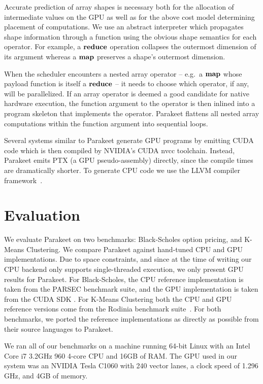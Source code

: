 \documentclass[10pt,twocolumn]{article}
\begin{document}
Accurate prediction of array shapes is necessary both for the allocation of intermediate values on the GPU as well as for the above cost model determining placement of computations. We use an abstract interpreter which propagates shape information through a function using the obvious shape semantics for each operator. For example, a $\mbox{\textbf{reduce}}$ operation collapses the outermost dimension of its argument whereas a $\mbox{\textbf{map}}$ preserves a shape's outermost dimension.

When the scheduler encounters a nested array operator -- e.g.~a $\mbox{\textbf{map}}$ whose payload function is itself a $\mbox{\textbf{reduce}}$ -- it needs to choose which operator, if any, will be parallelized.  If an array operator is deemed a good candidate for native hardware execution, the function argument to the operator is then inlined into a program skeleton that implements the operator. Parakeet flattens all nested array computations within the function argument into sequential loops.

Several systems similar to Parakeet \cite{Cata11,Chaf11} generate GPU programs by emitting CUDA code which is then compiled by NVIDIA's CUDA nvcc toolchain. Instead, Parakeet emits PTX (a GPU pseudo-assembly) directly, since the compile times are dramatically shorter. To generate CPU code we use the LLVM compiler framework~\cite{Latt02}.

\section{Evaluation}
\label{Evaluation}

We evaluate Parakeet on two benchmarks: Black-Scholes option pricing, and K-Means Clustering.  We compare Parakeet against hand-tuned CPU and GPU implementations.  Due to space constraints, and since at the time of writing our CPU backend only supports single-threaded execution, we only present GPU results for Parakeet.  For Black-Scholes, the CPU reference implementation is taken from the PARSEC \cite{Bien08} benchmark suite, and the GPU implementation is taken from the CUDA SDK \cite{NvidSD}.  For K-Means Clustering both the CPU and GPU reference versions come from the Rodinia benchmark suite~\cite{Che09}.  For both benchmarks, we ported the reference implementations as directly as possible from their source languages to Parakeet.

We ran all of our benchmarks on a machine running 64-bit Linux with an Intel Core i7 3.2GHz 960 4-core CPU  and 16GB of RAM.  The GPU used in our system was an NVIDIA Tesla C1060 with 240 vector lanes, a clock speed of 1.296 GHz, and 4GB of memory.
\end{document}
